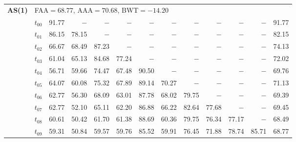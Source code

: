 \begin{table}[ht]
\begin{tabular}{@{}l l r r r r r r r r r r r@{}}
\midrule
\multirow{11}{*}{\textbf{AS(1)}} & \multicolumn{12}{l}{\quad\small FAA$=68.77$,\; AAA$=70.68$,\; BWT$=-14.20$} \\
 & $t_{00}$ & 91.77 & $-$ & $-$ & $-$ & $-$ & $-$ & $-$ & $-$ & $-$ & $-$ & 91.77 \\
 & $t_{01}$ & 86.15 & 78.15 & $-$ & $-$ & $-$ & $-$ & $-$ & $-$ & $-$ & $-$ & 82.15 \\
 & $t_{02}$ & 66.67 & 68.49 & 87.23 & $-$ & $-$ & $-$ & $-$ & $-$ & $-$ & $-$ & 74.13 \\
 & $t_{03}$ & 61.04 & 65.13 & 84.68 & 77.24 & $-$ & $-$ & $-$ & $-$ & $-$ & $-$ & 72.02 \\
 & $t_{04}$ & 56.71 & 59.66 & 74.47 & 67.48 & 90.50 & $-$ & $-$ & $-$ & $-$ & $-$ & 69.76 \\
 & $t_{05}$ & 64.07 & 60.08 & 75.32 & 67.89 & 89.14 & 70.27 & $-$ & $-$ & $-$ & $-$ & 71.13 \\
 & $t_{06}$ & 62.77 & 56.30 & 68.09 & 63.01 & 87.78 & 68.02 & 79.75 & $-$ & $-$ & $-$ & 69.39 \\
 & $t_{07}$ & 62.77 & 52.10 & 65.11 & 62.20 & 86.88 & 66.22 & 82.64 & 77.68 & $-$ & $-$ & 69.45 \\
 & $t_{08}$ & 60.61 & 50.42 & 61.70 & 61.38 & 88.69 & 60.36 & 79.75 & 76.34 & 77.17 & $-$ & 68.49 \\
 & $t_{09}$ & 59.31 & 50.84 & 59.57 & 59.76 & 85.52 & 59.91 & 76.45 & 71.88 & 78.74 & 85.71 & 68.77 \\
\bottomrule
\end{tabular}
\end{table}

